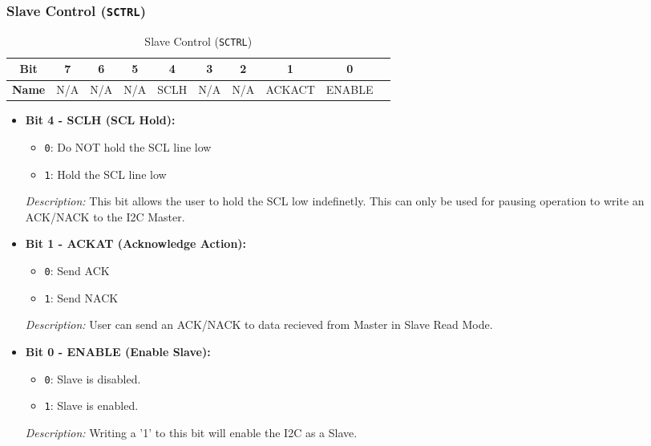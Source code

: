     \subsubsection{Slave Control (\texttt{SCTRL})}
    \label{sec:sctrl}
    
    \begin{table}[H]
        \centering
        \caption{Slave Control (\texttt{SCTRL})}
        \begin{tabular}{@{}cccccccccc@{}}
            \toprule
            \textbf{Bit} & 7 & 6 & 5 & 4 & 3 & 2 & 1 & 0 \\ \midrule
            \textbf{Name} & N/A & N/A & N/A & SCLH & N/A & N/A & ACKACT & ENABLE \\ \bottomrule
        \end{tabular}
        \label{tab:mctrl}
    \end{table}
    
    \begin{itemize}
        \item \textbf{Bit 4 - SCLH (SCL Hold):} 
        \begin{itemize}
            \item \texttt{0}: Do NOT hold the SCL line low
            \item \texttt{1}: Hold the SCL line low
        \end{itemize}
        \textit{Description:} This bit allows the user to hold the SCL low indefinetly. This can only be used for pausing operation to write an ACK/NACK to the I2C Master.
        
        \item \textbf{Bit 1 - ACKAT (Acknowledge Action):} 
        \begin{itemize}
            \item \texttt{0}: Send ACK
            \item \texttt{1}: Send NACK
        \end{itemize}
        \textit{Description:} User can send an ACK/NACK to data recieved from Master in Slave Read Mode.
        
        \item \textbf{Bit 0 - ENABLE (Enable Slave):} 
        \begin{itemize}
            \item \texttt{0}: Slave is disabled.
            \item \texttt{1}: Slave is enabled.
        \end{itemize}
        \textit{Description:} Writing a '1' to this bit will enable the I2C as a Slave.
    \end{itemize}
    
